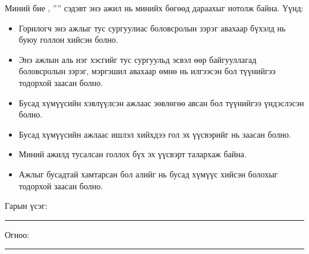 \begin{declaration}
\addchaptertocentry{\authorshipname}

\noindent Миний бие \shortname, ''{\ttitle}'' сэдэвт энэ ажил нь минийх бөгөөд дараахыг нотолж байна. Үүнд:

\begin{itemize} 
\item Горилогч энэ ажлыг тус сургуулиас боловсролын зэрэг авахаар бүхэлд нь буюу голлон хийсэн болно.
\item Энэ ажлын аль нэг хэсгийг тус сургуульд эсвэл өөр байгууллагад боловсролын зэрэг, мэргэшил авахаар өмнө нь илгээсэн бол түүнийгээ тодорхой заасан болно.
\item Бусад хүмүүсийн хэвлүүлсэн ажлаас зөвлөгөө авсан бол түүнийгээ үндэслэсэн болно.
\item Бусад хүмүүсийн ажлаас ишлэл хийхдээ гол эх үүсвэрийг нь заасан болно.
\item Миний ажилд тусалсан голлох бүх эх үүсвэрт талархаж байна.
\item Ажлыг бусадтай хамтарсан бол алийг нь бусад хүмүүс хийсэн болохыг тодорхой заасан болно.
\end{itemize}
\bigskip
 
\noindent Гарын үсэг: \rule[-0.5em]{12.7em}{0.5pt}
\bigskip

\noindent Огноо: \rule[-0.5em]{15em}{0.5pt}

\end{declaration}

\clearpage

